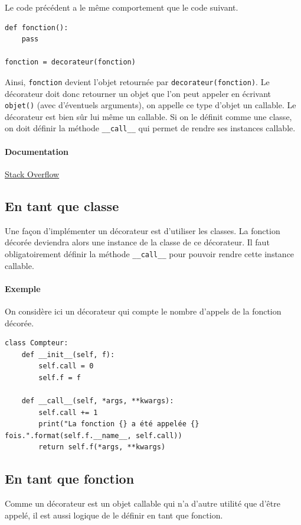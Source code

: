 \documentclass[a4paper, 10pt]{article}
\newcommand{\code}[1]{{\small\texttt{#1}}}
\begin{document}
Le code précédent a le même comportement que le code suivant.

\begin{verbatim}
def fonction():
    pass

fonction = decorateur(fonction)
\end{verbatim}

Ainsi, \code{fonction} devient l'objet retournée par \code{decorateur(fonction)}. Le décorateur doit donc retourner un objet que l'on peut appeler en écrivant \code{objet()} (avec d'éventuels arguments), on appelle ce type d'objet un \og callable\fg{}. Le décorateur est bien sûr lui même un callable. Si on le définit comme une classe, on doit définir la méthode \code{\_\_call\_\_} qui permet de rendre ses instances callable.

\paragraph{Documentation} \href{https://stackoverflow.com/questions/739654/how-to-make-a-chain-of-function-decorators/1594484#1594484}{Stack Overflow}

\subsection{En tant que classe}
Une façon d'implémenter un décorateur est d'utiliser les classes. La fonction décorée deviendra alors une instance de la classe de ce décorateur. Il faut obligatoirement définir la méthode \code{\_\_call\_\_} pour pouvoir rendre cette instance callable.

\paragraph{Exemple} On considère ici un décorateur qui compte le nombre d'appels de la fonction décorée.
\begin{verbatim}
class Compteur:
    def __init__(self, f):
        self.call = 0
        self.f = f

    def __call__(self, *args, **kwargs):
        self.call += 1
        print("La fonction {} a été appelée {} fois.".format(self.f.__name__, self.call))
        return self.f(*args, **kwargs)
\end{verbatim}
\subsection{En tant que fonction}
Comme un décorateur est un objet callable qui n'a d'autre utilité que d'être appelé, il est aussi logique de le définir en tant que fonction.
\end{document}
